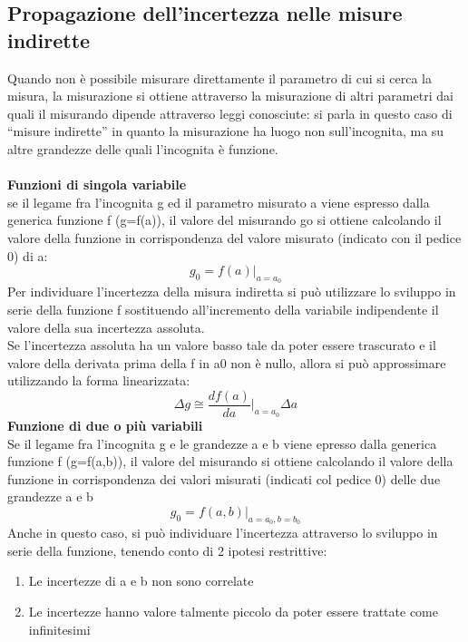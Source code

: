 \documentclass{article}
\begin{document}
\subsection{Propagazione dell'incertezza nelle misure indirette}
Quando non è possibile misurare direttamente il parametro di cui si cerca la misura, la 
misurazione si ottiene attraverso la misurazione di altri parametri dai quali il misurando dipende 
attraverso leggi conosciute: si parla in questo caso di “misure indirette” in quanto la misurazione 
ha luogo non sull’incognita, ma su altre grandezze delle quali l’incognita è funzione. \\\\
\textbf{Funzioni di singola variabile } \\
se il legame fra l’incognita g ed il parametro misurato a viene espresso dalla generica 
funzione f (g=f(a)), il valore del misurando go si ottiene calcolando il valore della funzione 
in corrispondenza del valore misurato (indicato con il pedice 0) di a: 
\begin{equation}
    g_{0}=f(a)\vert_{a=a_{0}}
\end{equation}
Per individuare l'incertezza della misura indiretta si può utilizzare lo sviluppo in serie della 
funzione f sostituendo all'incremento della variabile indipendente il valore della sua 
incertezza assoluta.\\ Se l’incertezza assoluta ha un valore basso tale da poter essere 
trascurato e il valore della derivata prima della f in a0 non è nullo, allora si può 
approssimare utilizzando la forma linearizzata:
\begin{equation}
    \Delta g \cong \frac{df(a)}{da}\vert_{a=a_{0}}\Delta a
\end{equation}
\textbf{Funzione di due o più variabili }\\
Se il legame fra l’incognita g e le grandezze a e b viene epresso dalla generica funzione f 
(g=f(a,b)), il valore del misurando si ottiene calcolando il valore della funzione in 
corrispondenza dei valori misurati (indicati col pedice 0) delle due grandezze a e b
\begin{equation}
    g_{0}=f(a,b)\vert_{a=a_{0},b=b_{0}}
\end{equation}
Anche in questo caso, si può individuare l'incertezza attraverso lo sviluppo in serie della 
funzione, tenendo conto di 2 ipotesi restrittive: 
\begin{enumerate}
    \item Le incertezze di a e b non sono correlate 
    \item Le incertezze hanno valore talmente piccolo da poter essere trattate come 
infinitesimi 
\end{enumerate}
\end{document}
